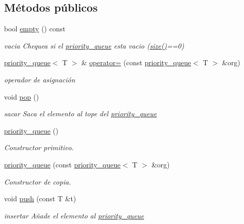 \subsection*{\-Métodos públicos}
\begin{DoxyCompactItemize}
\item 
bool \hyperlink{classpriority__queue_a48a3f0d42865aca9ccba2309548546ad}{empty} () const 
\begin{DoxyCompactList}\small\item\em vacia \-Chequea si el \hyperlink{classpriority__queue}{priority\-\_\-queue} esta vacio (\hyperlink{classpriority__queue_aa2eac4c0e3bc1f5e138c198236305bf8}{size()}==0) \end{DoxyCompactList}\item 
\hyperlink{classpriority__queue}{priority\-\_\-queue}$<$ \-T $>$ \& \hyperlink{classpriority__queue_a8fd99c9dc04de22c8f85b079c1cf4c77}{operator=} (const \hyperlink{classpriority__queue}{priority\-\_\-queue}$<$ \-T $>$ \&org)
\begin{DoxyCompactList}\small\item\em operador de asignación \end{DoxyCompactList}\item 
void \hyperlink{classpriority__queue_a1f7659b60842178f0ac5480ae573f643}{pop} ()
\begin{DoxyCompactList}\small\item\em sacar \-Saca el elemento al tope del \hyperlink{classpriority__queue}{priority\-\_\-queue} \end{DoxyCompactList}\item 
\hyperlink{classpriority__queue_afd661f4b9ebfca580d847bc6e1c90fd5}{priority\-\_\-queue} ()
\begin{DoxyCompactList}\small\item\em \-Constructor primitivo. \end{DoxyCompactList}\item 
\hyperlink{classpriority__queue_a6633a17cde10a7cad0677219ee514a63}{priority\-\_\-queue} (const \hyperlink{classpriority__queue}{priority\-\_\-queue}$<$ \-T $>$ \&org)
\begin{DoxyCompactList}\small\item\em \-Constructor de copia. \end{DoxyCompactList}\item 
void \hyperlink{classpriority__queue_a5752a7481aec928da27e13fa9a51479d}{push} (const \-T \&t)
\begin{DoxyCompactList}\small\item\em insertar \-Añade el elemento al \hyperlink{classpriority__queue}{priority\-\_\-queue} \end{DoxyCompactList}\item 

\end{DoxyCompactItemize}
